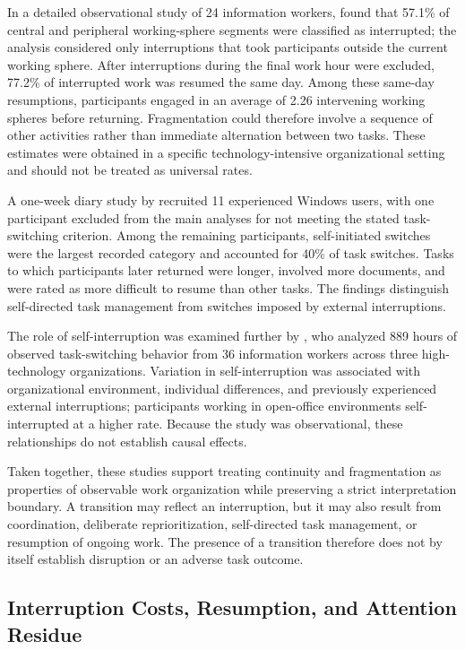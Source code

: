 In a detailed observational study of 24 information workers, \textcite{mark2005fragmentedWork} found that 57.1\% of central and peripheral working-sphere segments were classified as interrupted; the analysis considered only interruptions that took participants outside the current working sphere. After interruptions during the final work hour were excluded, 77.2\% of interrupted work was resumed the same day. Among these same-day resumptions, participants engaged in an average of 2.26 intervening working spheres before returning. Fragmentation could therefore involve a sequence of other activities rather than immediate alternation between two tasks. These estimates were obtained in a specific technology-intensive organizational setting and should not be treated as universal rates.

A one-week diary study by \textcite{czerwinski2004diary} recruited 11 experienced Windows users, with one participant excluded from the main analyses for not meeting the stated task-switching criterion. Among the remaining participants, self-initiated switches were the largest recorded category and accounted for 40\% of task switches. Tasks to which participants later returned were longer, involved more documents, and were rated as more difficult to resume than other tasks. The findings distinguish self-directed task management from switches imposed by external interruptions.

The role of self-interruption was examined further by \textcite{dabbish2011selfInterruption}, who analyzed 889 hours of observed task-switching behavior from 36 information workers across three high-technology organizations. Variation in self-interruption was associated with organizational environment, individual differences, and previously experienced external interruptions; participants working in open-office environments self-interrupted at a higher rate. Because the study was observational, these relationships do not establish causal effects.

Taken together, these studies support treating continuity and fragmentation as properties of observable work organization while preserving a strict interpretation boundary. A transition may reflect an interruption, but it may also result from coordination, deliberate reprioritization, self-directed task management, or resumption of ongoing work. The presence of a transition therefore does not by itself establish disruption or an adverse task outcome.

\subsection{Interruption Costs, Resumption, and Attention Residue}

